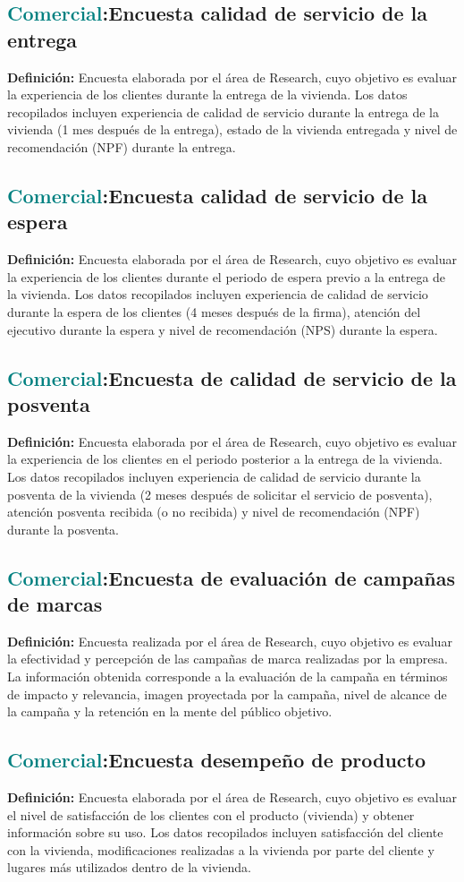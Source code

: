 \documentclass[12pt]{article}
\begin{document}
\subsection{\textcolor{teal}{Comercial}:{Encuesta calidad de servicio de la entrega}}
\textbf{Definición:} Encuesta elaborada por el área de Research, cuyo objetivo es evaluar la experiencia de los clientes durante la entrega de la vivienda. Los datos recopilados incluyen experiencia de calidad de servicio durante la entrega de la vivienda (1 mes después de la entrega), estado de la vivienda entregada y nivel de recomendación (NPF) durante la entrega.
\subsection{\textcolor{teal}{Comercial}:{Encuesta calidad de servicio de la espera}}
\textbf{Definición:} Encuesta elaborada por el área de Research, cuyo objetivo es evaluar la experiencia de los clientes durante el periodo de espera previo a la entrega de la vivienda. Los datos recopilados incluyen experiencia de calidad de servicio durante la espera de los clientes (4 meses después de la firma), atención del ejecutivo durante la espera y nivel de recomendación (NPS) durante la espera.
\subsection{\textcolor{teal}{Comercial}:{Encuesta de calidad de servicio de la posventa}}
\textbf{Definición:} Encuesta elaborada por el área de Research, cuyo objetivo es evaluar la experiencia de los clientes en el periodo posterior a la entrega de la vivienda. Los datos recopilados incluyen experiencia de calidad de servicio durante la posventa de la vivienda (2 meses después de solicitar el servicio de posventa), atención posventa recibida (o no recibida) y nivel de recomendación (NPF) durante la posventa.
\subsection{\textcolor{teal}{Comercial}:{Encuesta de evaluación de campañas de marcas}}
\textbf{Definición:} Encuesta realizada por el área de Research, cuyo objetivo es evaluar la efectividad y percepción de las campañas de marca realizadas por la empresa. La información obtenida corresponde a la evaluación de la campaña en términos de impacto y relevancia, imagen proyectada por la campaña, nivel de alcance de la campaña y la retención en la mente del público objetivo.
\subsection{\textcolor{teal}{Comercial}:{Encuesta desempeño de producto}}
\textbf{Definición:} Encuesta elaborada por el área de Research, cuyo objetivo es evaluar el nivel de satisfacción de los clientes con el producto (vivienda) y obtener información sobre su uso. Los datos recopilados incluyen satisfacción del cliente con la vivienda, modificaciones realizadas a la vivienda por parte del cliente y lugares más utilizados dentro de la vivienda.
\end{document}
